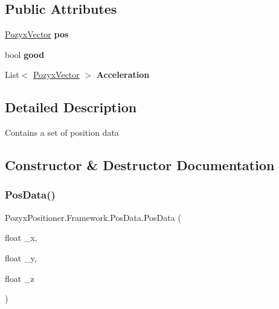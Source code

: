 \subsection*{Public Attributes}
\begin{DoxyCompactItemize}
\item 
\mbox{\label{struct_pozyx_positioner_1_1_framework_1_1_pos_data_a2fde856e364bb1dfcc74e654d7eef2f9}} 
\hyperlink{struct_pozyx_positioner_1_1_framework_1_1_pozyx_vector}{Pozyx\+Vector} {\bfseries pos}
\item 
\mbox{\label{struct_pozyx_positioner_1_1_framework_1_1_pos_data_a4a3b04e06e199ce825d35917fe9a2edb}} 
bool {\bfseries good}
\item 
\mbox{\label{struct_pozyx_positioner_1_1_framework_1_1_pos_data_a5ad625aaf62369db8ea4cf6943f16686}} 
List$<$ \hyperlink{struct_pozyx_positioner_1_1_framework_1_1_pozyx_vector}{Pozyx\+Vector} $>$ {\bfseries Acceleration}
\end{DoxyCompactItemize}


\subsection{Detailed Description}
Contains a set of position data 



\subsection{Constructor \& Destructor Documentation}
\mbox{\label{struct_pozyx_positioner_1_1_framework_1_1_pos_data_a3a87fee055f3468cb530c7b2cb71098f}} 
\subsubsection{\texorpdfstring{Pos\+Data()}{PosData()}}
{\footnotesize\ttfamily Pozyx\+Positioner.\+Framework.\+Pos\+Data.\+Pos\+Data (\begin{DoxyParamCaption}\item[{float}]{\+\_\+x,  }\item[{float}]{\+\_\+y,  }\item[{float}]{\+\_\+z }\end{DoxyParamCaption})}



